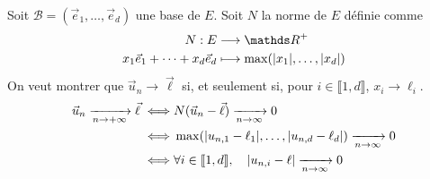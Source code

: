 \begin{prv}
	Soit $\mathcal{B} = (\vec{e}_1, \ldots, \vec{e}_d)$\/ une base de $E$. Soit $N$\/ la norme de $E$\/ définie comme \begin{align*}
		N: E &\longrightarrow \R^+ \\
		x_1 \vec{e}_1 + \cdots + x_d \vec{e}_d &\longmapsto \max(|x_1|, \ldots, |x_d|)
	\end{align*}
	On veut montrer que $\vec{u}_n \to \vec{\ell}$\/ si, et seulement si, pour $i \in \llbracket 1,d \rrbracket$, $x_i \to \ell_i$.
	\begin{align*}
		\vec{u}_n \xrightarrow[n \to +\infty]{} \vec{\ell} \iff& N(\vec{u}_n - \vec{\ell}) \xrightarrow[n\to \infty]{} 0 \\
		\iff& \max(|u_{n,1} - \ell_1|, \ldots,{|u_{n,d} - \ell_d|}) \xrightarrow[n\to \infty]{} 0 \\
		\iff& \forall i \in \llbracket 1,d \rrbracket, \quad |u_{n,i} - \ell| \xrightarrow[n\to \infty]{} 0 \\
	\end{align*}
\end{prv}


